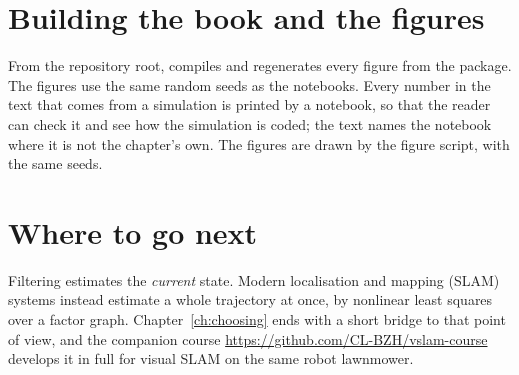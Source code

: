 \section*{Building the book and the figures}

From the repository root,  compiles 
and  regenerates every figure from the
 package. The figures use the same random seeds as
the notebooks. Every number in the text that comes from a simulation is
printed by a notebook, so that the reader can check it and see how the
simulation is coded; the text names the notebook where it is not the
chapter's own. The figures are drawn by the figure script, with the same
seeds.

\section*{Where to go next}

Filtering estimates the \emph{current} state. Modern localisation and
mapping (SLAM) systems instead estimate a whole trajectory at once, by
nonlinear least squares over a factor graph. Chapter~\ref{ch:choosing}
ends with a short bridge to that point of view, and the companion course
\url{https://github.com/CL-BZH/vslam-course} develops it in full for
visual SLAM on the same robot lawnmower.

